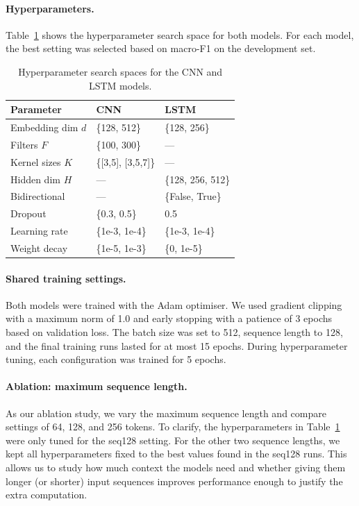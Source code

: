 \paragraph{Hyperparameters.}
Table~\ref{tab:hyperparameters} shows the hyperparameter search space for both models. For each model, the best setting was selected based on macro-F1 on the development set.

\begin{table}[H]
\centering
\small
\begin{tabular}{lll}
\toprule
\textbf{Parameter} & \textbf{CNN} & \textbf{LSTM} \\
\midrule
Embedding dim $d$    & \{128, 512\}       & \{128, 256\} \\
Filters $F$          & \{100, 300\}       & --- \\
Kernel sizes $K$     & \{[3,5], [3,5,7]\} & --- \\
Hidden dim $H$       & ---                & \{128, 256, 512\} \\
Bidirectional        & ---                & \{False, True\} \\
Dropout              & \{0.3, 0.5\}       & 0.5 \\
Learning rate        & \{1e-3, 1e-4\}     & \{1e-3, 1e-4\} \\
Weight decay         & \{1e-5, 1e-3\}     & \{0, 1e-5\} \\
\bottomrule
\end{tabular}
\caption{Hyperparameter search spaces for the CNN and LSTM models.}
\label{tab:hyperparameters}
\end{table}

\paragraph{Shared training settings.}
Both models were trained with the Adam optimiser. We used gradient clipping with a maximum norm of 1.0 and early stopping with a patience of 3 epochs based on validation loss. The batch size was set to 512, sequence length to 128, and the final training runs lasted for at most 15 epochs. During hyperparameter tuning, each configuration was trained for 5 epochs.

\paragraph{Ablation: maximum sequence length.}
As our ablation study, we vary the maximum sequence length and compare settings of 64, 128, and 256 tokens. To clarify, the hyperparameters in Table~\ref{tab:hyperparameters} were only tuned for the seq128 setting. For the other two sequence lengths, we kept all hyperparameters fixed to the best values found in the seq128 runs. This allows us to study how much context the models need and whether giving them longer (or shorter) input sequences improves performance enough to justify the extra computation.


